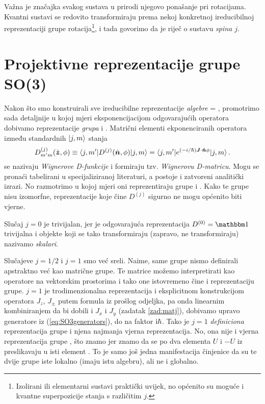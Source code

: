 Važna je značajka svakog sustava u prirodi 
njegovo ponašanje pri rotacijama. Kvantni sustavi se redovito
transformiraju prema nekoj konkretnoj ireducibilnoj reprezentaciji grupe
rotacija\footnote{Izolirani ili elementarni sustavi praktički uvijek, no
    općenito su moguće i kvantne superpozicije stanja s različitim $j$.}, i
 tada govorimo da je riječ o sustavu \emph{spina $j$}.


\section{Projektivne reprezentacije grupe SO(3)}
 \label{sec:projektivnerep}

Nakon što smo konstruirali sve ireducibilne reprezentacije \emph{algebre} 
 = , promotrimo sada detaljnije u kojoj mjeri eksponencijacijom
odgovarajućih operatora dobivamo reprezentacije \emph{grupa}  i .
Matrični elementi ekponenciranih operatora između standardnih
$| j, m \rangle$ stanja
\begin{equation}
    D^{(j)}_{m'm}(\hat{\vec{z}},\phi)  \equiv  \bra{j,m'} D^{(j)}(\hat{\vec{n}},\phi) \ket{j, m} 
    =\bra{j,m'} e^{(-i/\hbar)\vec{J}\cdot\unitn\phi}\ket{j, m} \,.
    \label{eq:WignerD}
\end{equation}
se nazivaju \emph{Wignerove D-funkcije} i formiraju tzv. \emph{Wignerovu D-matricu}.
Mogu se pronaći tabelirani u specijaliziranoj literaturi, a postoje
i zatvoreni analitički izrazi. No razmotrimo u kojoj mjeri oni
reprezentiraju grupe  i . Kako te grupe nisu izomorfne,
reprezentacije koje čine $D^{(j)}$ sigurno ne mogu općenito biti vjerne.

Slučaj $j=0$ je trivijalan, jer je odgovarajuća reprezentacija $D^{(0)}=\Eins$
trivijalna i objekte koji se tako transformiraju (zapravo, ne transformiraju)
nazivamo \emph{skalari}.

Slučajeve $j=1/2$ i $j=1$ smo već sreli. Naime, same grupe nismo definirali
apstraktno već kao matrične grupe. Te matrice možemo interpretirati kao operatore
na vektorskim prostorima i tako one istovremeno čine i reprezentaciju grupe.
$j=1$ je trodimenzionalna reprezentacija i eksplicitnom konstrukcijom
operatora $J_z$, $J_\pm$ putem formula iz prošlog odjeljka, pa onda linearnim
kombiniranjem da bi dobili i $J_x$ i $J_y$ (zadatak \ref{zad:matj}), 
dobivamo upravo generatore iz (\ref{eq:SO3generators}), do na faktor $\textrm{i}\hbar$.
Tako je $j=1$ \emph{definiciona} reprezentacija grupe  i njena najmanja
vjerna reprezentacija.
No, ona nije i vjerna reprezentacija grupe , što znamo jer znamo da
se po dva elementa $U$ i $-U$ iz   preslikavaju u isti element 
. To je samo još jedna manifestacija činjenice da su te dvije grupe
iste lokalno (imaju istu algebru), ali ne i globalno.


